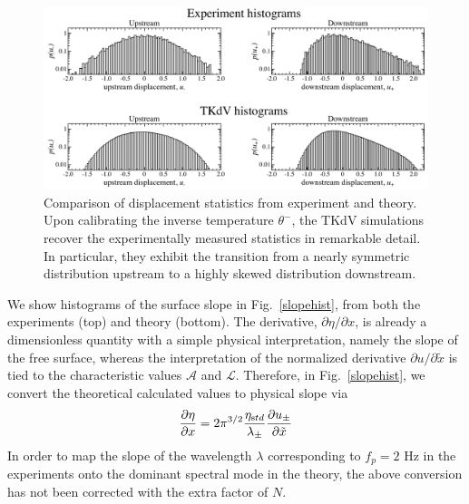 \documentclass[11pt]{article}
\newcommand{\pd}[2]    { \frac{\partial #1} {\partial #2} }
\newcommand{\freqp}{f_p}
\newcommand{\etastd}{\eta_{\text std}}
\newcommand{\lam}{\lambda}
\newcommand{\lamupdn}{\lam_{\pm}}
\newcommand{\lamfac}{N}
\newcommand{\ampscale}{\mathcal{A}}
\newcommand{\lengthscale}{\mathcal{L}}
\newcommand{\uupdn}{u_{\pm}}
\newcommand{\thup}{\theta^{-}}
\begin{document}
\begin{figure}%
\begin{center}
\includegraphics[width = 0.99 \linewidth]{Figs/uhist.pdf}
\caption{ 
Comparison of displacement statistics from experiment and theory. Upon calibrating the inverse temperature $\thup$, the TKdV simulations recover the experimentally measured statistics in remarkable detail. In particular, they exhibit the transition from a nearly symmetric distribution upstream to a highly skewed distribution downstream.
}
\label{uhist}
\end{center}
\end{figure}

We show histograms of the surface slope in Fig.~\ref{slopehist}, from both the experiments (top) and theory (bottom). The derivative, $\partial \eta / \partial x$, is already a dimensionless quantity with a simple physical interpretation, namely the slope of the free surface, whereas the interpretation of the normalized derivative $\partial u/\partial \tilde{x}$ is tied to the characteristic values $\ampscale$ and $\lengthscale$. 
Therefore, in Fig.~\ref{slopehist}, we convert the theoretical calculated values to physical slope via
\begin{equation}
\pd{\eta}{x} = 2 \pi^{3/2} \frac{\etastd}{\lamupdn} \pd{\uupdn}{\tilde{x}}
\end{equation}
In order to map the slope of the wavelength $\lam$ corresponding to $\freqp = 2$ Hz in the experiments onto the dominant spectral mode in the theory, the above conversion has not been corrected with the extra factor of $\lamfac$.
\end{document}

